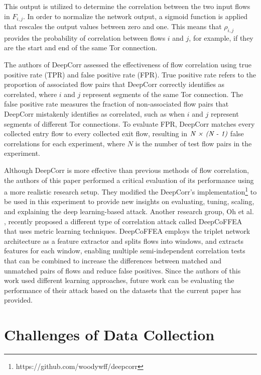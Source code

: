 \documentclass[sigconf]{acmart}
\begin{document}
This output is utilized to determine the correlation between the two input flows in $F_{i,j}$. In order to normalize the network output, a sigmoid function is applied that rescales the output values between zero and one. This means that \emph{$\rho_{i,j}$} provides the probability of correlation between flows $i$ and $j$, for example, if they are the start and end of the same Tor connection.

The authors of DeepCorr assessed the effectiveness of flow correlation using true positive rate (TPR) and false positive rate (FPR). True positive rate refers to the proportion of associated flow pairs that DeepCorr correctly identifies as correlated, where $i$ and $j$ represent segments of the same Tor connection. The false positive rate measures the fraction of non-associated flow pairs that DeepCorr mistakenly identifies as correlated, such as when $i$ and $j$ represent segments of different Tor connections. To evaluate FPR, DeepCorr matches every collected entry flow to every collected exit flow, resulting in $\emph{N × (N - 1)}$ false correlations for each experiment, where $N$ is the number of test flow pairs in the experiment.



Although DeepCorr is more effective than previous methods of flow correlation, the authors of this paper performed a critical evaluation of its performance using a more realistic research setup. They modified the DeepCorr's implementation\footnote{https://github.com/woodywff/deepcorr} to be used in this experiment to provide new insights on evaluating, tuning, scaling, and explaining the deep learning-based attack. Another research group, Oh et al. \cite{oh2022deepcoffea}, recently proposed a different type of correlation attack called DeepCoFFEA that uses metric learning techniques. DeepCoFFEA employs the triplet network architecture as a feature extractor and splits flows into windows, and extracts features for each window, enabling multiple semi-independent correlation tests that can be combined to increase the differences between matched and unmatched pairs of flows and reduce false positives. Since the authors of this work used different learning approaches, future work can be evaluating the performance of their attack based on the datasets that the current paper has provided. 

\vspace{3mm}

\section{Challenges of Data Collection} \label{4}
\end{document}
